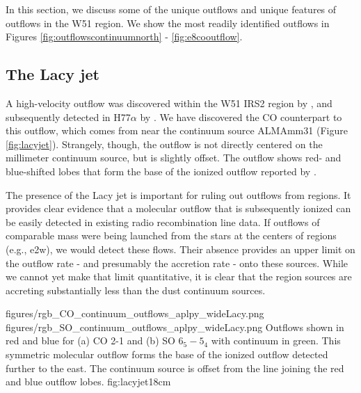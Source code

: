 \documentclass{emulateapj}
\begin{document}
In this section, we discuss some of the unique outflows and unique features of
outflows in the W51 region.  We show the most readily identified outflows in
Figures \ref{fig:outflowscontinuumnorth} - \ref{fig:e8cooutflow}.

\subsection{The Lacy jet}
\label{sec:lacyjet}
A high-velocity outflow was discovered within the W51 IRS2 region by
\citet{Lacy2007a}, and subsequently detected in H77$\alpha$ by
\citet{Ginsburg2016b}.  We have discovered the CO counterpart to this
outflow, which comes from near the continuum source ALMAmm31 (Figure
\ref{fig:lacyjet}).  Strangely, though, the outflow is not directly centered on
the millimeter continuum source, but is slightly offset.  The outflow shows red- and
blue-shifted lobes that form the base of the ionized outflow reported by
\citet[][Figure \ref{fig:outflowscontinuumnorth}]{Lacy2007a}.

The presence of the Lacy jet is important for ruling out outflows from \hii
regions.  It provides clear evidence that a molecular outflow that is
subsequently ionized can be easily detected in existing radio recombination
line data.  If outflows of comparable mass were being launched from the stars
at the centers of \hchii regions (e.g., e2w), we would detect these flows.
Their absence provides an upper limit on the outflow rate - and presumably the
accretion rate - onto these sources.  While we cannot yet make that limit
quantitative, it is clear that the \hchii region sources are accreting
substantially less than the dust continuum sources.



\FigureTwo
{figures/rgb_CO_continuum_outflows_aplpy_wideLacy.png}
{figures/rgb_SO_continuum_outflows_aplpy_wideLacy.png}
{Outflows shown in red and blue for (a) CO 2-1 and (b) SO $6_5-5_4$ with
continuum in green.  This symmetric molecular outflow forms the base of the
\citet{Lacy2007a} ionized outflow detected further to the east.
The continuum source is offset from the line joining the red and blue outflow lobes.}
{fig:lacyjet}{1}{8cm}
\end{document}
